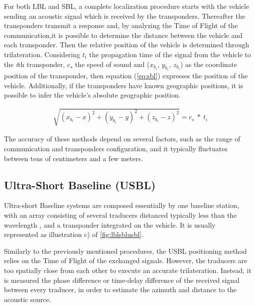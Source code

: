 For both LBL and SBL, a complete localization procedure starts with the vehicle sending an acoustic signal which is received by the transponders. Thereafter the transponders transmit a response and, by analyzing the Time of Flight of the communication,it is possible to determine the distance between the vehicle and each transponder. Then the relative position of the vehicle is determined through trilateration. Considering $t_{i}$ the propagation time of the signal from the vehicle to the \textit{i}th transponder, $c_s$ the speed of sound and ($x_{b_{i}}$, $y_{b_{i}}$, $z_{b_{i}}$) as the coordinate position of the transponder, then equation (\ref{eq:sbl}) \cite{sbl} expresses the position of the vehicle. Additionally, if the transponders have known geographic positions, it is possible to infer the vehicle's absolute geographic position. 

\begin{eqnarray}
	&\sqrt{ (x_{b_{i}}-x)^2 + (y_{b_{i}}-y)^2 + (z_{b_{i}}-z)^2 } = c_s\ *\ t_{i}
	\label{eq:sbl}
\end{eqnarray}


The accuracy of these methods depend on several factors, such as the range of communication and transponders configuration, and it typically fluctuates between tens of centimeters and a few meters.


\subsection{Ultra-Short Baseline (USBL)}

Ultra-short Baseline systems are composed essentially by one baseline station, with an array consisting of several traducers distanced typically less than the wavelength \cite{lblsblusbl}, and a transponder integrated on the vehicle. It is usually represented as illustration c) of \ref{fig:lblsblusbl}.

Similarly to the previously mentioned procedures, the USBL positioning method relies on the Time of Flight of the exchanged signals. However, the traducers are too spatially close from each other to execute an accurate trilateration. Instead, it is measured the phase difference or time-delay difference of the received signal between every traducer, in order to estimate the azimuth and distance to the acoustic source. 

